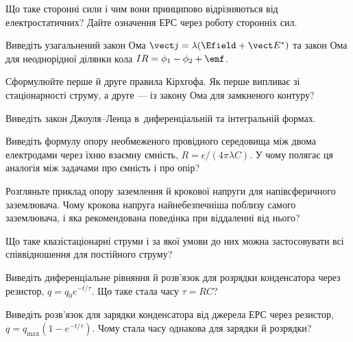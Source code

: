 \begin{Questions}
\begin{quizlist}
	\item Що таке сторонні сили і чим вони принципово відрізняються від електростатичних? Дайте означення ЕРС через роботу сторонніх сил.
	\item Виведіть узагальнений закон Ома $\vect j = \lambda(\Efield+\vect E^*)$ та закон Ома для неоднорідної ділянки кола $IR = \phi_1-\phi_2+\emf$.
	\item Сформулюйте перше й друге правила Кірхгофа. Як перше випливає зі стаціонарності струму, а друге --- із закону Ома для замкненого контуру?
	\item Виведіть закон Джоуля--Ленца в~диференціальній та інтегральній формах.
	\item Виведіть формулу опору необмеженого провідного середовища між двома електродами через їхню взаємну ємність, $R = \epsilon/(4\pi\lambda C)$. У чому полягає ця аналогія між задачами про ємність і про опір?
	\item Розгляньте приклад опору заземлення й крокової напруги для напівсферичного заземлювача. Чому крокова напруга найнебезпечніша поблизу самого заземлювача, і яка рекомендована поведінка при віддаленні від нього?
	\item Що таке квазістаціонарні струми і за якої умови до них можна застосовувати всі співвідношення для постійного струму?
	\item Виведіть диференціальне рівняння й розв'язок для розрядки конденсатора через резистор, $q=q_0e^{-t/\tau}$. Що таке стала часу $\tau=RC$?
	\item Виведіть розв'язок для зарядки конденсатора від джерела ЕРС через резистор, $q=q_{\max}(1-e^{-t/\tau})$. Чому стала часу однакова для зарядки й розрядки?
\end{quizlist}
\end{Questions}

